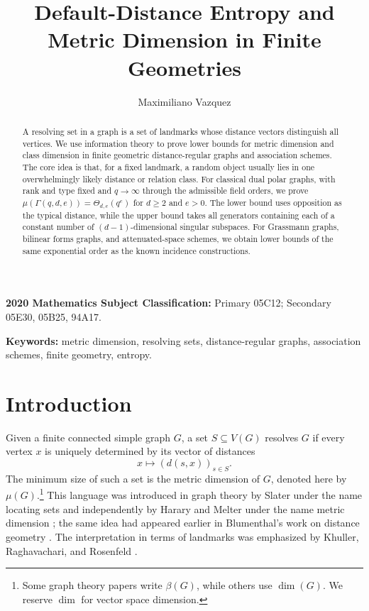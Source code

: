 \documentclass[11pt]{article}
\title{Default-Distance Entropy and Metric Dimension in Finite Geometries}
\author{Maximiliano Vazquez}
\date{}
\theoremstyle{definition}
\theoremstyle{remark}
\begin{document}
\maketitle


\begin{abstract}
A resolving set in a graph is a set of landmarks whose distance vectors
distinguish all vertices.  We use information theory to prove lower bounds
for metric dimension and class dimension in finite geometric
distance-regular graphs and association schemes.  The core idea is that, for
a fixed landmark, a random object usually lies in one overwhelmingly likely
distance or relation class.  For classical dual polar graphs, with rank and
type fixed and $q\to\infty$ through the admissible field orders, we prove
$\mu(\Gamma(q,d,e))=\Theta_{d,e}(q^e)$ for $d\geq2$ and $e>0$.  The lower bound uses opposition as the typical distance, while the upper bound takes all generators containing each of a constant number of \((d-1)\)-dimensional singular subspaces.  For Grassmann
graphs, bilinear forms graphs, and attenuated-space schemes, we obtain lower
bounds of the same exponential order as the known incidence constructions.
\end{abstract}
\noindent\textbf{2020 Mathematics Subject Classification:}
Primary 05C12; Secondary 05E30, 05B25, 94A17.

\medskip
\noindent\textbf{Keywords:}
metric dimension, resolving sets, distance-regular graphs,
association schemes, finite geometry, entropy.
\section{Introduction}

Given a finite connected simple graph $G$, a set $S\subseteq V(G)$ 
resolves
$G$ if every vertex $x$ is uniquely determined by its vector of distances
\[
        x\longmapsto (d(s,x))_{s\in S}.
\]
The minimum size of such a set is the metric dimension of $G$, denoted 
here
by $\mu(G)$.\footnote{Some graph theory papers write $\beta(G)$, while
others use $\dim(G)$.  We reserve $\dim$ for vector space dimension.}
This language was introduced in graph theory by Slater under the name
locating sets and independently by Harary and Melter under the name metric
dimension \cite{Slater1975,HararyMelter1976}; the same idea had appeared
earlier in Blumenthal's work on distance geometry \cite{Blumenthal1953}.
The interpretation in terms of landmarks was emphasized by Khuller,
Raghavachari, and Rosenfeld \cite{KhullerRaghavachariRosenfeld}.
\end{document}
